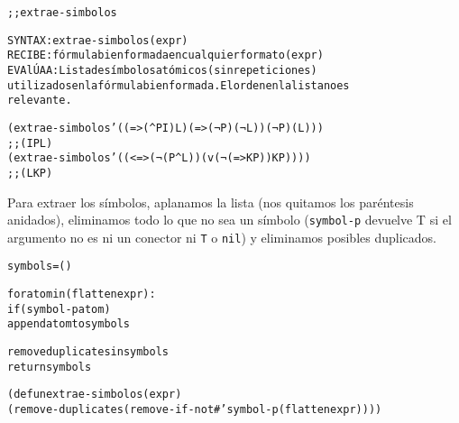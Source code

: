 \begin{aibox}{\function}
\begin{alltt}
;; extrae-simbolos

SYNTAX: extrae-simbolos (expr)
RECIBE : fórmula bien formada en cualquier formato (expr)
EVAlÚA A: Lista de símbolos atómicos (sin repeticiones)
	utilizados en la fórmula bien formada. El orden en la lista no es
	relevante.

\end{alltt}
\end{aibox}

\begin{aibox}{\examples}
\begin{alltt}
(extrae-simbolos '((=> (^ P I) L) (=> (¬ P) (¬ L)) (¬ P) (L)))
;; (I P L)
(extrae-simbolos '((<=> (¬ (P ^ L)) (v (¬ (=> K P)) K P))))
;; (L K P)
\end{alltt}

\end{aibox}

\begin{aibox}{\comments}
Para extraer los símbolos, aplanamos la lista (nos quitamos los paréntesis anidados), eliminamos todo lo que no sea un símbolo (\texttt{symbol-p} devuelve T si el argumento no es ni un conector ni \texttt{T} o \texttt{nil}) y eliminamos posibles duplicados.
\end{aibox}

\begin{aibox}{\pseudocode}
\begin{alltt}
symbols = ()

for atom in (flatten expr):
	if (symbol-p atom)
		append atom to symbols

remove duplicates in symbols
return symbols

\end{alltt}
\end{aibox}

\begin{aibox}{\code}

\begin{alltt}

(defun extrae-simbolos (expr)
	(remove-duplicates (remove-if-not #'symbol-p (flatten expr))))

\end{alltt}
\end{aibox}
